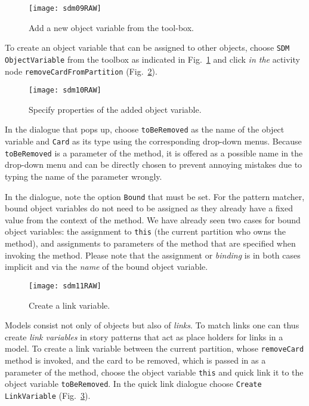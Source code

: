 \begin{figure}[htp]
\begin{center}
  \texttt{[image: sdm09RAW]}
  \caption{Add a new object variable from the tool-box.}  
  \label{fig:tool_box}
\end{center}
\end{figure}

To create an object variable that can be assigned to other objects, choose \texttt{SDM ObjectVariable} from the toolbox as indicated in Fig.~\ref{fig:tool_box}
and click \emph{in the} activity node \texttt{removeCardFromPartition} (Fig.~\ref{fig:object_variable_properties}).


\begin{figure}[htp]
\begin{center}
  \texttt{[image: sdm10RAW]}
  \caption{Specify properties of the added object variable.}  
  \label{fig:object_variable_properties}
\end{center}
\end{figure}

In the dialogue that pops up, choose \texttt{toBeRemoved} as the name of the object variable and \texttt{Card} as its type using the corresponding drop-down
menus. Because \texttt{toBeRemoved} is a parameter of the method, it is offered as a possible name in the drop-down menu and can be directly chosen to prevent
annoying mistakes due to typing the name of the parameter wrongly.

In the dialogue, note the option \texttt{Bound} that must be set. For the pattern matcher, bound object variables do not need to be assigned as they already
have a fixed value from the context of the method.   We have already seen two cases  for bound object variables: the assignment to \texttt{this} (the current 
partition who owns the method), and assignments to parameters of the   method that  are specified when invoking the method.   Please note
that the assignment or \emph{binding} is in both cases implicit and via the \emph{name} of the bound object variable.

\begin{figure}[htp]
\begin{center}
  \texttt{[image: sdm11RAW]}
  \caption{Create a link variable.}   
  \label{fig:link_variable}
\end{center}
\end{figure}

Models consist not only of objects but also of \emph{links}. To match links one can thus create \emph{link variables} in story patterns that act as place
 holders for links in a model. To create a link variable between the current partition, whose \texttt{removeCard} method is invoked, and the
card to be removed, which is passed in as a parameter of the method, choose the object variable \texttt{this} and quick link it to the object variable
\texttt{toBeRemoved}. In the quick link dialogue choose \texttt{Create LinkVariable} (Fig.~\ref{fig:link_variable}).

